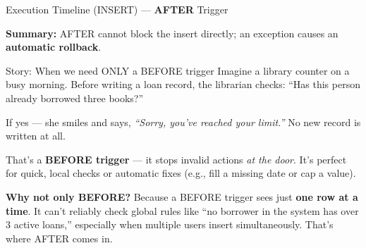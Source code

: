 \documentclass{beamer}
\begin{document}
\begin{frame}{Execution Timeline (INSERT) — \textbf{AFTER} Trigger}
\centering
{}
\vspace{1mm}

{\scriptsize\textcolor{nus-blue}{\textbf{Summary:}} AFTER cannot block the insert directly; an exception causes an \textbf{automatic rollback}.}
\end{frame}

\begin{frame}{Story: When we need ONLY a BEFORE trigger}
\small
Imagine a library counter on a busy morning.  
Before writing a loan record, the librarian checks:  
“Has this person already borrowed three books?”  

If yes — she smiles and says,  
\textit{“Sorry, you’ve reached your limit.”}  
No new record is written at all.

That’s a \textbf{BEFORE trigger} — it stops invalid actions \textit{at the door}.  
It’s perfect for quick, local checks or automatic fixes  
(e.g., fill a missing date or cap a value).

\textcolor{nus-blue}{\textbf{Why not only BEFORE?}}  
Because a BEFORE trigger sees just \textbf{one row at a time}.  
It can’t reliably check global rules like “no borrower in the system has over 3 active loans,”  
especially when multiple users insert simultaneously.  
That’s where AFTER comes in.
\end{frame}
\end{document}
